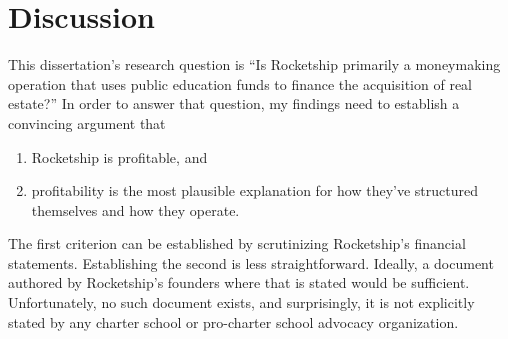 
\chapter{Discussion}\label{ch:discussion}

\begin{comment}
  With sheer repetition, and in the absence of evidence, a myth about K-12 education has taken hold: American public schools are abject failures. Something must be done to reign in the rapacious unions who protect and coddle incompetent teachers. Something must be done about lazy administrators who block progress. Something must be done to give back to parents control over their children's education. And that something is charter schools.

  Rocketship is one of the most successful charter school chains in the United States, but their success is not in educating elementary school children. Case in point: In August 2023, the Fort Worth Star-Telegram reported that only 23\% of Rocketship's students met state standards in reading and language arts \parencite{Allen.Ruiz2023} compared to 53\% statewide \parencite{TexasEducationAgency2023}.

  Instead, Rocketship's success is in making money.
\end{comment}
This dissertation's research question is ``Is Rocketship primarily a moneymaking operation that uses public education funds to finance the acquisition of real estate?'' In order to answer that question, my findings need to establish a convincing argument that
\begin{enumerate}
  \item Rocketship is profitable, and
  \item profitability is the most plausible explanation for how they've structured themselves and how they operate.
\end{enumerate}

The first criterion can be established by scrutinizing Rocketship's financial statements. Establishing the second is less straightforward. Ideally, a document authored by Rocketship's founders where that is stated would be sufficient. Unfortunately, no such document exists, and surprisingly, it is not explicitly stated by any charter school or pro-charter school advocacy organization.

